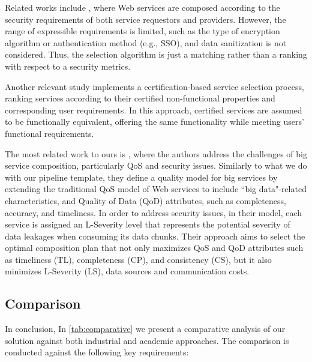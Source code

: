 Related works include \cite{secureWScomposition}, where Web services are composed according to the security requirements of both service requestors and providers. However, the range of expressible requirements is limited, such as the type of encryption algorithm or authentication method (e.g., SSO), and data sanitization is not considered. Thus, the selection algorithm is just a matching rather than a ranking with respect to a security metrics.

Another relevant study \cite{9844845} implements a certification-based service selection process, ranking services according to their certified non-functional properties and corresponding user requirements. In this approach, certified services are assumed to be functionally equivalent, offering the same functionality while meeting users' functional requirements.

The most related work to ours is \cite{SELLAMI2020102732}, where the authors address the challenges of big service composition, particularly QoS and security issues. Similarly to what we do with our pipeline template, they define a quality model for big services by extending the traditional QoS model of Web services to include ``big data"-related characteristics, and Quality of Data (QoD) attributes, such as completeness, accuracy, and timeliness. In order to address security issues, in their model, each service is assigned an L-Severity level \cite{Lseverity} that represents the potential severity of data leakages when consuming its data chunks.
Their approach aims to select the optimal composition plan that not only maximizes QoS and QoD attributes such as timeliness (TL), completeness (CP), and consistency (CS), but it also minimizes L-Severity (LS), data sources and communication costs.
\subsection{Comparison}
In conclusion, In \cref{tab:comparative} we present a comparative analysis of our solution against both industrial and academic approaches. The comparison is conducted against the following key requirements:

